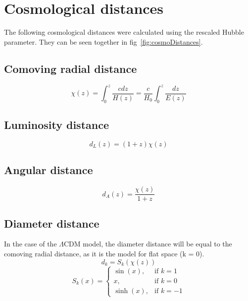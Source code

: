 \documentclass[12pt]{article}
\begin{document}
\section{Cosmological distances}
The following cosmological distances were calculated using the rescaled Hubble parameter. They can be seen together in fig~\ref{fig:cosmoDistances}.

\subsection{Comoving radial distance}
\begin{equation}
	\chi(z) = \int_{0}^{z}\frac{cdz}{H(z)} = \frac{c}{H_{0}} \int_{0}^{z}\frac{dz}{E(z)}
	\label{eq:comovingDist}
\end{equation}

\subsection{Luminosity distance}
\begin{equation}
	d_{L}(z) = (1 + z)  \chi(z)
	\label{eq:lumDist}
\end{equation}

\subsection{Angular distance}
\begin{equation}
	d_{A}(z) = \frac{\chi(z)}{1 + z}  
	\label{eq:angDist}
\end{equation}

\subsection{Diameter distance}
In the case of the $\Lambda$CDM model, the diameter distance will be equal to the comoving radial distance, as it is the model for flat space (k = 0).
\begin{equation}
	d_{k} = S_{k}(\chi(z))
	\label{eq:diamDist}
\end{equation}
\begin{equation}
	S_{k}(x) = \begin{cases}
		\sin(x), & \text{if $k = 1$}\\
		x, & \text{if $k = 0$}\\
		\sinh(x), & \text{if $k = -1$}
	  \end{cases}
	\label{eq:diamDist2}
\end{equation}
\end{document}
